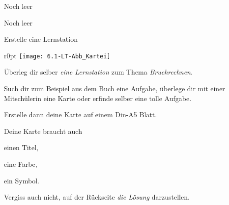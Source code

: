 \documentclass[12pt,a5paper,landscape]{scrartcl}
\begin{document}
	\begin{karte1}{Noch leer}
	\end{karte1}
	
	\begin{karte1}{Noch leer}
	\end{karte1}
	
	\begin{karte3}[\symPartner]{Erstelle eine Lernstation}
		\vspace*{1cm}
		\begin{wrapfigure}{r}{0pt}
			\texttt{[image: 6.1-LT-Abb\_Kartei]}
		\end{wrapfigure}
		Überleg dir selber \emph{eine Lernstation} zum Thema \emph{Bruchrechnen}.
		
		Such dir zum Beispiel aus dem Buch eine Aufgabe, überlege dir mit einer Mitschülerin eine Karte oder erfinde selber eine tolle Aufgabe.
		
		Erstelle dann deine Karte auf einem Din-A5 Blatt.
		
		Deine Karte braucht auch
		\begin{smallitemize}
			\item einen Titel,
			\item eine Farbe,
			\item ein Symbol.
		\end{smallitemize}
		
		Vergiss auch nicht, auf der Rückseite \emph{die Lösung} darzustellen.

	\end{karte3}
	
	\leereKarte
	
\end{document}
